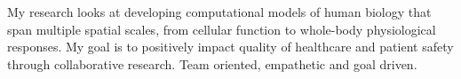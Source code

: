 \break
\begin{cvparagraph}
\par
{My research looks at developing computational models of human biology that span multiple spatial scales, from cellular function to whole-body physiological responses. My goal is to positively impact quality of healthcare and patient safety through collaborative research. Team oriented, empathetic and goal driven.}
\end{cvparagraph}